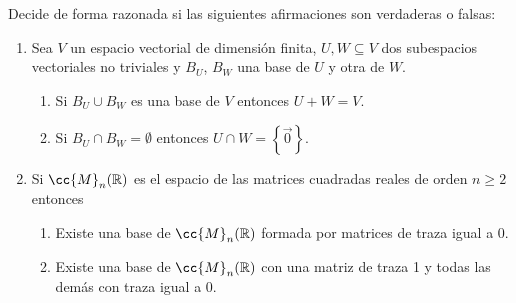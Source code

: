 \documentclass[12pt]{article}
\begin{document}
	\begin{ejercicio}[2.5 puntos] Decide de forma razonada si las siguientes afirmaciones son verdaderas o falsas:
		
		\begin{enumerate} 
			\item Sea $V$ un espacio vectorial de dimensión finita, $U,W \subseteq V$ dos subespacios vectoriales no
			triviales y $B_U$, $B_W$ una base de $U$ y otra de $W$.
			\begin{enumerate}
				\item  Si $B_U \cup B_W$ es una base de $V$ entonces $U + W = V$.
				\item  Si $B_U \cap B_W = \emptyset$ entonces $U \cap W = \left\{\vec{0}\right\}$.
			\end{enumerate}
			
			\item Si $\cc{M}_n(\R)$ es el espacio de las matrices cuadradas reales de orden $n \geq 2$ entonces
			\begin{enumerate}
				\item  Existe una base de $\cc{M}_n(\R)$ formada por matrices de traza igual a 0.
				\item  Existe una base de $\cc{M}_n(\R)$ con una matriz de traza 1 y todas las demás con traza igual
				a 0.
			\end{enumerate}
		\end{enumerate}
	\end{ejercicio}
	
	\newpage
	\setcounter{ejercicio}{0} %
	
\end{document}
